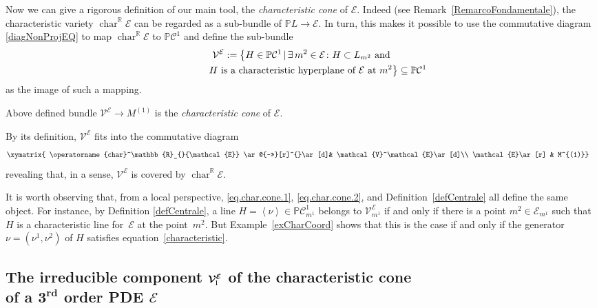 \documentclass[pdftex]{sigma}
\newcommand{\R}{\mathbb{R}}
\newcommand{\C}{\mathcal{C}}
\newcommand{\M}{\mathcal{V}}
\newcommand{\MM}{\mathcal{V}_{\textrm{\normalfont I}}}
\newcommand{\E}{\mathcal{E}}
\newcommand{\Span}[1]{\left\langle #1 \right\rangle}
\renewcommand{\P}{\mathbb{P}}
\newcommand{\Char}[1]{\operatorname{char}^\R_{#1}}
\newcommand{\Rd}{^\textrm{rd}}
\newcommand{\w}{\nu}
\newcommand{\elle}{H}
\numberwithin{equation}{section}
\begin{document}
Now we can give a rigorous def\/inition of our main tool, the \emph{characteristic cone} of $\E$. Indeed (see Remark~\ref{RemarcoFondamentale}), the characteristic variety $\Char{}{\E}$ can be regarded as a sub-bundle of $\P L\longrightarrow \E$. In turn, this makes it possible to use the commutative diagram \eqref{diagNonProjEQ} to map $\Char{}{\E}$ to $\P\C^1$ and def\/ine the sub-bundle
\begin{gather*}
\M^\E:=\big\{ H\in \P\C^1\,|\, \exists \, m^2\in\E\colon {H}\subset L_{m^2}\textrm{ and}\\
\hphantom{\M^\E:=\big\{}{} H\textrm{ is a characteristic hyperplane of }\E\textrm{ at } m^2 \big\}\subseteq\P\C^1
\end{gather*}
 as the image of such a mapping.
\begin{Definition}\label{defCentrale}
Above def\/ined bundle $\M^\E\longrightarrow M^{(1)}$ is the \emph{characteristic cone} of $\E$.
\end{Definition}
By its def\/inition, $\M^\E$ f\/its into the commutative diagram
\begin{gather}\label{diagNonProjEQ-Char}
\begin{split}&
\xymatrix{ \Char{}{\E} \ar@{->>}[r]^{}\ar[d]& \M^\E\ar[d]\\
\E\ar[r] & M^{(1)}}
\end{split}
\end{gather}
revealing that, in a sense, $\M^\E$ is covered by $ \Char{}{\E}$.

It is worth observing that, from a local perspective,
\eqref{eq.char.cone.1}, \eqref{eq.char.cone.2}, and Def\/inition~\ref{defCentrale} all def\/ine the same object.
For instance, by Def\/inition \ref{defCentrale}, a line $\elle=\Span{\w}\in \P\C^1_{m^1}$
 belongs to $ \M^\E_{m^1}$ if and only if there is a point $m^2\in\E_{m^1}$ such that $\elle$ is a characteristic line for~$\E$ at the point~$m^2$. But Example~\ref{exCharCoord} shows that this is the case if and only if the generator $\w=(\w^1,\w^2)$ of $\elle$ satisf\/ies equation~\eqref{characteristic}.

 \subsection[The irreducible component $\MM^\E$ of the characteristic cone of a $3\Rd$ order PDE $\E$]{The irreducible component $\boldsymbol{\MM^\E}$ of the characteristic cone\\ of a $\boldsymbol{3\Rd}$ order PDE $\boldsymbol{\E}$}\label{subsubComponenteLineare}
\end{document}

